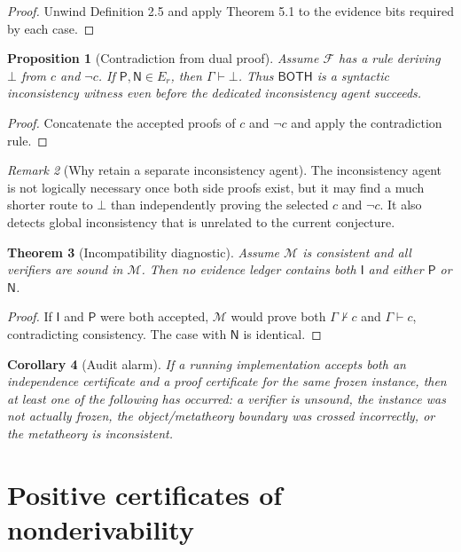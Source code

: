 \documentclass[11pt]{article}
\newtheorem{theorem}{Theorem}[section]
\newtheorem{proposition}[theorem]{Proposition}
\newtheorem{corollary}[theorem]{Corollary}
\theoremstyle{definition}
\theoremstyle{remark}
\newtheorem{remark}[theorem]{Remark}
\newcommand{\Both}{\mathsf{BOTH}}
\newcommand{\Plus}{\mathsf{P}}
\newcommand{\Minus}{\mathsf{N}}
\newcommand{\IndEv}{\mathsf{I}}
\newcommand{\M}{\mathcal M}
\newcommand{\F}{\mathcal F}
\newcommand{\Gammaa}{\Gamma}
\newcommand{\bottomf}{\bot}
\begin{document}
\begin{proof}
Unwind Definition 2.5 and apply Theorem 5.1 to the evidence bits required by each case.
\end{proof}

\begin{proposition}[Contradiction from dual proof]
Assume $\F$ has a rule deriving $\bottomf$ from $c$ and $\neg c$. If $\Plus,\Minus\in E_r$, then $\Gammaa\vdash\bottomf$. Thus $\Both$ is a syntactic inconsistency witness even before the dedicated inconsistency agent succeeds.
\end{proposition}

\begin{proof}
Concatenate the accepted proofs of $c$ and $\neg c$ and apply the contradiction rule.
\end{proof}

\begin{remark}[Why retain a separate inconsistency agent]
The inconsistency agent is not logically necessary once both side proofs exist, but it may find a much shorter route to $\bottomf$ than independently proving the selected $c$ and $\neg c$. It also detects global inconsistency that is unrelated to the current conjecture.
\end{remark}

\begin{theorem}[Incompatibility diagnostic]
Assume $\M$ is consistent and all verifiers are sound in $\M$. Then no evidence ledger contains both $\IndEv$ and either $\Plus$ or $\Minus$.
\end{theorem}

\begin{proof}
If $\IndEv$ and $\Plus$ were both accepted, $\M$ would prove both $\Gammaa\nvdash c$ and $\Gammaa\vdash c$, contradicting consistency. The case with $\Minus$ is identical.
\end{proof}

\begin{corollary}[Audit alarm]
If a running implementation accepts both an independence certificate and a proof certificate for the same frozen instance, then at least one of the following has occurred: a verifier is unsound, the instance was not actually frozen, the object/metatheory boundary was crossed incorrectly, or the metatheory is inconsistent.
\end{corollary}

\section{Positive certificates of nonderivability}
\end{document}
